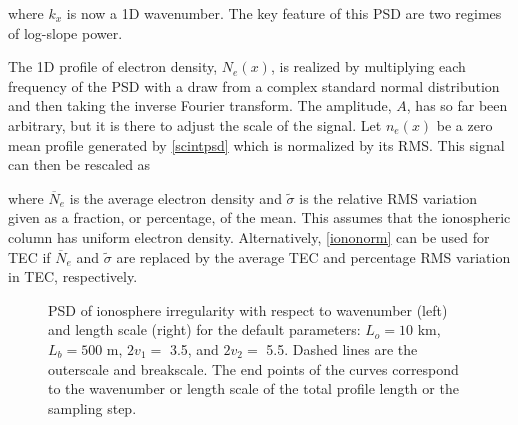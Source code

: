 \noindent where $k_x$ is now a 1D wavenumber. The key feature of this PSD are two regimes of log-slope power. 

The 1D profile of electron density, $N_e(x)$, is realized by multiplying each frequency of the PSD with a draw from a complex standard normal distribution and then taking the inverse Fourier transform. The amplitude, $A$, has so far been arbitrary, but it is there to adjust the scale of the signal. Let $n_e(x)$ be a zero mean profile generated by \eqref{scintpsd} which is normalized by its RMS. This signal can then be rescaled as

\noindent where $\overline{N}_e$ is the average electron density and $\tilde{\sigma}$ is the relative RMS variation given as a fraction, or percentage, of the mean. This assumes that the ionospheric column has uniform electron density. Alternatively, \eqref{iononorm} can be used for TEC if $\overline{N}_e$ and $\tilde{\sigma}$ are replaced by the average TEC and percentage RMS variation in TEC, respectively. %


\begin{figure}[H] 
   \centering
   \caption{PSD of ionosphere irregularity with respect to wavenumber (left) and length scale (right) for the default parameters: $L_o = 10$ km, $L_b = 500$ m, $2v_1=$ 3.5, and $2v_2=$ 5.5.  Dashed lines are the outerscale and breakscale. The end points of the curves correspond to the wavenumber or length scale of the total profile length or the sampling step. }
\end{figure}

